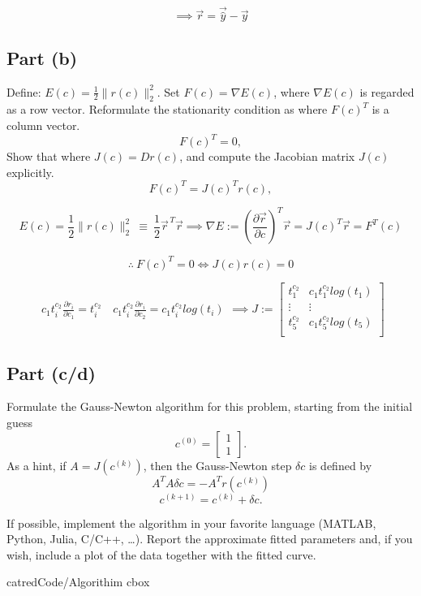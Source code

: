 \[
	\implies \vec{r} = \vec{\hat{y}}-\vec{y}
\]


\subsection*{Part (b)}
Define: $E(c) = \frac{1}{2} \|r(c)\|_2^2.$
Set $F(c) = \nabla E(c)$, where $\nabla E(c)$ is regarded as a row vector. Reformulate the stationarity condition as where $F(c)^T$ is a column vector.
\[ F(c)^T = 0, \]
Show that where $J(c) = D r(c)$, and compute the Jacobian matrix $J(c)$ explicitly.
\[ F(c)^T = J(c)^T r(c), \]

\[
	E(c) = \frac{1}{2} \|r(c)\|_2^2 ~\equiv~ \frac{1}{2} \vec{r}^{\,T} \vec{r} \implies \nabla E :=
	\left(\frac{\partial \vec{r}}{\partial c}\right)^{T} \vec{r} = J(c)^{T} \vec{r} = F^T(c)
\]

\[
	\therefore ~F(c)^T = 0 \iff J(c)r(c)=0
\]

\[
	\begin{gathered}
		c_1t_i^{c_2} \frac{\partial r_i}{\partial c_1} = t_i^{c_2} \quad
		c_1t_i^{c_2} \frac{\partial r_i}{\partial c_2} = c_1t_i^{c_2}log(t_i)
	\end{gathered}
	\implies
	J :=
	\begin{bmatrix}
		t_1^{c_2} & c_1t_1^{c_2}log(t_1) \\
		\vdots    & \vdots               \\
		t_5^{c_2} & c_1t_5^{c_2}log(t_5) \\
	\end{bmatrix}
\]

\subsection*{Part (c/d)}
Formulate the Gauss-Newton algorithm for this problem, starting from the initial guess
\[ c^{(0)} = \begin{bmatrix} 1 \\ 1 \end{bmatrix}. \]
As a hint, if $A = J(c^{(k)})$, then the Gauss-Newton step $\delta c$ is defined by
\[ A^T A \delta c = -A^T r(c^{(k)}) \]
\[ c^{(k+1)} = c^{(k)} + \delta c. \]

If possible, implement the algorithm in your favorite language (MATLAB, Python, Julia, C/C++, \dots). Report the approximate fitted parameters and, if you wish, include a plot of the data together with the fitted curve.

\begin{cbox}{catred}{Code/Algorithim}
	cbox\inputminted[linenos, breaklines, frame=lines, framesep=2mm, numbersep=8pt, tabsize=4]{python}{/home/sybil/Documents/School/2026-Spring-bk/MATH-341/HW/06/code/main.py}
\end{cbox}

